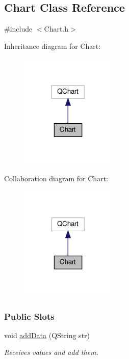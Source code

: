 \hypertarget{classChart}{}\subsection{Chart Class Reference}
\label{classChart}


{\ttfamily \#include $<$Chart.\+h$>$}



Inheritance diagram for Chart\+:\nopagebreak
\begin{figure}[H]
\begin{center}
\leavevmode
\includegraphics[width=128pt]{classChart__inherit__graph}
\end{center}
\end{figure}


Collaboration diagram for Chart\+:\nopagebreak
\begin{figure}[H]
\begin{center}
\leavevmode
\includegraphics[width=128pt]{classChart__coll__graph}
\end{center}
\end{figure}
\subsubsection*{Public Slots}
\begin{DoxyCompactItemize}
\item 
void \hyperlink{classChart_abefbafd5e6582e649d40444d16331b94}{add\+Data} (Q\+String str)
\begin{DoxyCompactList}\small\item\em Receives values and add them. \end{DoxyCompactList}\end{DoxyCompactItemize}
